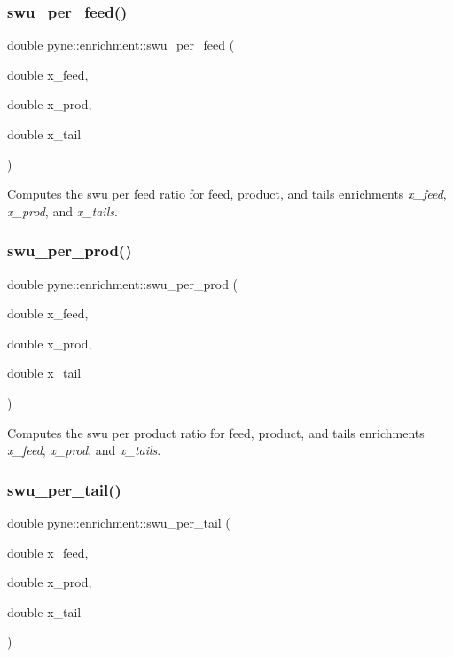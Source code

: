 \subsubsection{\texorpdfstring{swu\+\_\+per\+\_\+feed()}{swu\_per\_feed()}}
{\footnotesize\ttfamily double pyne\+::enrichment\+::swu\+\_\+per\+\_\+feed (\begin{DoxyParamCaption}\item[{double}]{x\+\_\+feed,  }\item[{double}]{x\+\_\+prod,  }\item[{double}]{x\+\_\+tail }\end{DoxyParamCaption})}

Computes the swu per feed ratio for feed, product, and tails enrichments {\itshape x\+\_\+feed}, {\itshape x\+\_\+prod}, and {\itshape x\+\_\+tails}. \mbox{\label{namespacepyne_1_1enrichment_a46dd4b2623e771e39541548cdb67ef69}} 
\subsubsection{\texorpdfstring{swu\+\_\+per\+\_\+prod()}{swu\_per\_prod()}}
{\footnotesize\ttfamily double pyne\+::enrichment\+::swu\+\_\+per\+\_\+prod (\begin{DoxyParamCaption}\item[{double}]{x\+\_\+feed,  }\item[{double}]{x\+\_\+prod,  }\item[{double}]{x\+\_\+tail }\end{DoxyParamCaption})}

Computes the swu per product ratio for feed, product, and tails enrichments {\itshape x\+\_\+feed}, {\itshape x\+\_\+prod}, and {\itshape x\+\_\+tails}. \mbox{\label{namespacepyne_1_1enrichment_a4afec2f93f512c5032219bfaf88bf681}} 
\subsubsection{\texorpdfstring{swu\+\_\+per\+\_\+tail()}{swu\_per\_tail()}}
{\footnotesize\ttfamily double pyne\+::enrichment\+::swu\+\_\+per\+\_\+tail (\begin{DoxyParamCaption}\item[{double}]{x\+\_\+feed,  }\item[{double}]{x\+\_\+prod,  }\item[{double}]{x\+\_\+tail }\end{DoxyParamCaption})}

